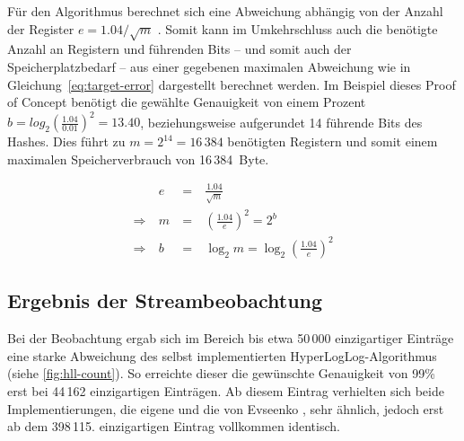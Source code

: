 Für den Algorithmus berechnet sich eine Abweichung abhängig von der Anzahl der Register $e=1.04/\sqrt{m}$ \cite{flajolet2007}.
Somit kann im Umkehrschluss auch die benötigte Anzahl an Registern und führenden Bits -- und somit auch der Speicherplatzbedarf -- aus einer gegebenen maximalen Abweichung wie in Gleichung~\eqref{eq:target-error} dargestellt berechnet werden.
Im Beispiel dieses Proof of Concept benötigt die gewählte Genauigkeit von einem Prozent $b = log_2 (\frac{1.04}{0.01})^2 = 13.40$, beziehungsweise aufgerundet 14 führende Bits des Hashes.
Dies führt zu $m = 2^{14} = 16\,384$ benötigten Registern und somit einem maximalen Speicherverbrauch von 16\,384~Byte.

\begin{equation}
	\begin{alignedat}{2}
		& e & \: = \: & \frac{1.04}{\sqrt{m}} \\
		\Rightarrow \: & m & \: = \: & \left(\frac{1.04}{e}\right)^2 = 2^b \\
		\Rightarrow \: & b & \: = \: & \log_2 m = \log_2 \left(\frac{1.04}{e}\right)^2
	\end{alignedat}
	\label{eq:target-error}
\end{equation}

\subsection{Ergebnis der Streambeobachtung}

Bei der Beobachtung ergab sich im Bereich bis etwa 50\,000 einzigartiger Einträge eine starke Abweichung des selbst implementierten HyperLogLog-Algorithmus (siehe \autoref{fig:hll-count}).
So erreichte dieser die gewünschte Genauigkeit von 99\% erst bei 44\,162 einzigartigen Einträgen.
Ab diesem Eintrag verhielten sich beide Implementierungen, die eigene und die von Evseenko \cite{evseenko2018}, sehr ähnlich, jedoch erst ab dem 398\,115. einzigartigen Eintrag vollkommen identisch.

